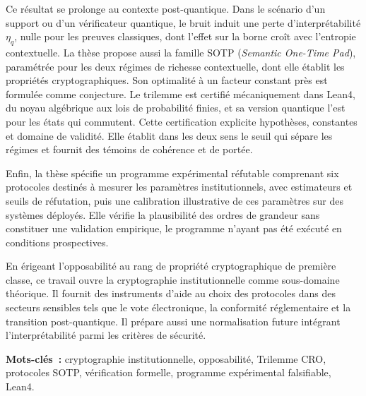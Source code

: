 \begin{sloppypar}
Ce r\'esultat se prolonge au contexte post-quantique. Dans le sc\'enario
d'un support ou d'un v\'erificateur quantique, le bruit induit une perte
d'interpr\'etabilit\'e $\eta_q$, nulle pour les preuves classiques, dont
l'effet sur la borne cro\^it avec l'entropie contextuelle. La th\`ese
propose aussi la famille SOTP (\emph{Semantic One-Time Pad}), param\'etr\'ee pour les deux
r\'egimes de richesse contextuelle, dont elle \'etablit les propri\'et\'es
cryptographiques. Son optimalit\'e \`a un facteur constant pr\`es est formul\'ee comme
conjecture. Le trilemme est certifi\'e m\'ecaniquement dans Lean4, du noyau
alg\'ebrique aux lois de probabilit\'e finies, et sa version quantique l'est pour les \'etats qui
commutent. Cette certification explicite
hypoth\`eses, constantes et domaine de validit\'e. Elle \'etablit dans les deux
sens le seuil qui s\'epare les r\'egimes et fournit des t\'emoins de coh\'erence
et de port\'ee.

Enfin, la th\`ese sp\'ecifie un programme exp\'erimental r\'efutable
comprenant six protocoles destin\'es \`a mesurer les param\`etres
institutionnels, avec estimateurs et seuils de r\'efutation, puis une
calibration illustrative de ces param\`etres sur des syst\`emes
d\'eploy\'es. Elle v\'erifie la plausibilit\'e des ordres de grandeur sans
constituer une validation empirique, le programme n'ayant pas \'et\'e ex\'ecut\'e en conditions
prospectives.

En \'erigeant l'opposabilit\'e au rang de propri\'et\'e cryptographique de
premi\`ere classe, ce travail ouvre la cryptographie institutionnelle
comme sous-domaine th\'eorique. Il fournit des instruments d'aide au
choix des protocoles dans des secteurs sensibles tels que le vote
\'electronique, la conformit\'e r\'eglementaire et la transition
post-quantique. Il pr\'epare aussi une normalisation future int\'egrant
l'interpr\'etabilit\'e parmi les crit\`eres de s\'ecurit\'e.

\vspace{0.5cm}
\noindent\textbf{Mots-cl\'es~:} cryptographie institutionnelle,
opposabilit\'e, Trilemme CRO, protocoles SOTP, v\'erification formelle,
programme exp\'erimental falsifiable, Lean4.
\end{sloppypar}